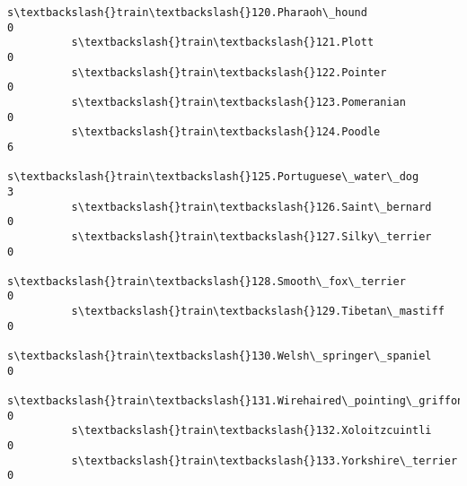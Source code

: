 \documentclass[11pt]{article}
\begin{document}
\begin{Verbatim}[commandchars=\\\{\}]
          s\textbackslash{}train\textbackslash{}120.Pharaoh\_hound                                        0   
          s\textbackslash{}train\textbackslash{}121.Plott                                                0   
          s\textbackslash{}train\textbackslash{}122.Pointer                                              0   
          s\textbackslash{}train\textbackslash{}123.Pomeranian                                           0   
          s\textbackslash{}train\textbackslash{}124.Poodle                                               6   
          s\textbackslash{}train\textbackslash{}125.Portuguese\_water\_dog                                 3   
          s\textbackslash{}train\textbackslash{}126.Saint\_bernard                                        0   
          s\textbackslash{}train\textbackslash{}127.Silky\_terrier                                        0   
          s\textbackslash{}train\textbackslash{}128.Smooth\_fox\_terrier                                   0   
          s\textbackslash{}train\textbackslash{}129.Tibetan\_mastiff                                      0   
          s\textbackslash{}train\textbackslash{}130.Welsh\_springer\_spaniel                               0   
          s\textbackslash{}train\textbackslash{}131.Wirehaired\_pointing\_griffon                          0   
          s\textbackslash{}train\textbackslash{}132.Xoloitzcuintli                                       0   
          s\textbackslash{}train\textbackslash{}133.Yorkshire\_terrier                                    0   
          

\end{Verbatim}
\end{document}
